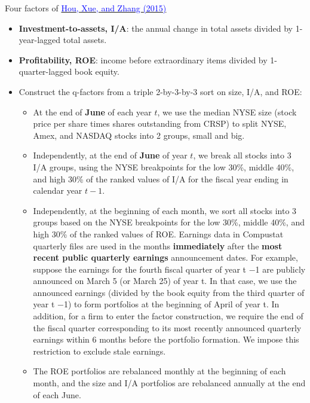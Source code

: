 \documentclass{beamer}
\begin{document}
\begin{frame}[allowframebreaks]{Four factors of \href{https://academic.oup.com/rfs/article/28/3/650/1574802}{\textcolor{blue}{Hou, Xue, and Zhang (2015)}}}
	
	\begin{itemize}
		\item \textbf{Investment-to-assets, I/A}: the annual change in total assets divided by 1-year-lagged total assets.
		\item \textbf{Profitability, ROE}: income before extraordinary items divided by 1-quarter-lagged book equity.
		\item Construct the q-factors from a triple 2-by-3-by-3 sort on size, I/A, and ROE:
		\begin{itemize}
			\item At the end of \textbf{June} of each year $ t $, we use the median NYSE size (stock price per share times shares outstanding from CRSP) to split NYSE, Amex, and NASDAQ stocks into 2 groups, small and big.
			\item  Independently, at the end of \textbf{June} of year $ t $, we break all stocks into 3 I/A groups, using the NYSE breakpoints for the low 30\%, middle 40\%, and high 30\% of the ranked values of I/A for the fiscal year ending in calendar year $ t −1 $.
			\item Independently, at the beginning of each month, we sort all stocks into 3 groups based on the NYSE breakpoints for the low 30\%, middle 40\%, and high 30\% of the ranked values of ROE. Earnings data in Compustat quarterly files are used in the months \textbf{immediately} after the \textbf{most recent public quarterly earnings} announcement dates. For example, suppose the earnings for the fourth fiscal quarter of year t −1 are publicly announced on March 5 (or March 25) of year t. In that case, we use the announced earnings (divided by the book equity from the third quarter of year t −1) to form portfolios at the beginning of April of year t. In addition, for a firm to enter the factor construction, we require the end of the fiscal quarter corresponding to its most recently announced quarterly earnings within 6 months before the portfolio formation. We impose this restriction to exclude stale earnings.
			\item The ROE portfolios are rebalanced monthly at the beginning of each month, and the size and I/A portfolios are rebalanced annually at the end of each June.
		\end{itemize}
	\end{itemize}
\end{frame}
\end{document}
